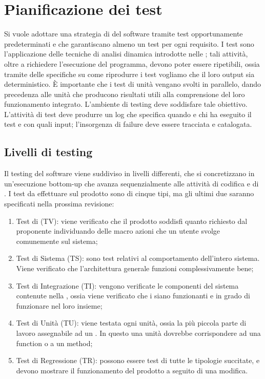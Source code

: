 \newpage
\section{Pianificazione dei test}

	Si vuole adottare una strategia di  del software tramite test opportunamente predeterminati e che garantiscano almeno un test per ogni requisito. I test sono l’applicazione delle tecniche di analisi dinamica introdotte nelle \NormeDiProgetto; tali attività, oltre a richiedere l’esecuzione del programma, devono poter essere ripetibili, ossia tramite delle specifiche su come riprodurre i test vogliamo che il loro output sia deterministico. È importante che i test di unità vengano svolti in parallelo, dando precedenza alle unità che producono risultati utili alla comprensione del loro funzionamento integrato. L’ambiente di testing deve soddisfare tale obiettivo. L’attività di test deve produrre un log che specifica quando e chi ha eseguito il test e con quali input; l’insorgenza di failure deve essere tracciata e catalogata.

\subsection{Livelli di testing}
	Il testing del software viene suddiviso in livelli differenti, che si concretizzano in un'esecuzione bottom-up che avanza sequenzialmente alle attività di codifica e di . I test da effettuare sul prodotto sono di cinque tipi, ma gli ultimi due saranno specificati nella prossima revisione:

\begin{enumerate}
	\item Test di  (TV): viene verificato che il prodotto soddisfi quanto richiesto dal proponente individuando delle macro azioni che un utente svolge comunemente sul sistema;
	\item Test di Sistema (TS): sono test relativi al comportamento dell’intero sistema. Viene verificato che l'architettura generale funzioni complessivamente bene;
	\item Test di Integrazione (TI): vengono verificate le componenti del sistema contenute nella \SpecificaTecnica, ossia viene verificato che i  siano funzionanti e in grado di funzionare nel loro insieme;
	\item Test di Unità (TU): viene testata ogni unità, ossia la più piccola parte di lavoro assegnabile ad un . In questo  una unità dovrebbe corrispondere ad una function o a un method;
	\item Test di Regressione (TR): possono essere test di tutte le tipologie succitate, e devono mostrare il funzionamento del prodotto a seguito di una modifica.
\end{enumerate}

